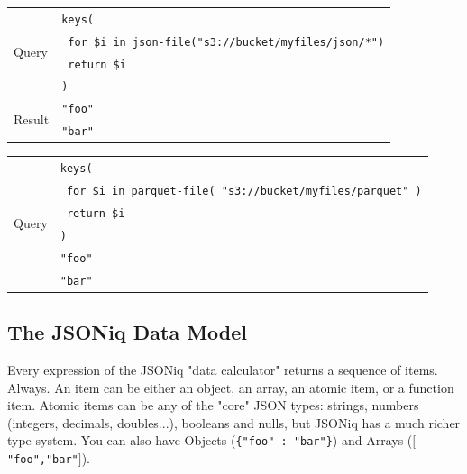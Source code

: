 \noindent
\begin{minipage}{0.66\textwidth}
\begin{center}
    \begin{tabular}{|l|l|}
        \hline
        \multirow{4}{*}{Query} & \texttt{keys(} \\
            & \texttt{  for \$i in json-file("s3://bucket/myfiles/json/*")} \\
            & \texttt{  return \$i} \\
            & \texttt{)} \\ \hline
        \multirow{2}{*}{Result} & \texttt{"foo"} \\
            & \texttt{"bar"} \\ \hline
    \end{tabular}
\end{center}
\end{minipage}

\vspace{1\baselineskip}

\noindent
\begin{minipage}{0.72\textwidth}
\begin{center}
    \begin{tabular}{|l|l|}
        \hline
        \multirow{6}{*}{Query} & \texttt{keys(} \\
            & \texttt{  for \$i in parquet-file( "s3://bucket/myfiles/parquet" )} \\
            & \texttt{  return \$i} \\
            & \texttt{)} \\ \hline
        \multirow{2}{*}{Result} & \texttt{"foo"} \\
            & \texttt{"bar"} \\ \hline
    \end{tabular}
\end{center}
\end{minipage}


\subsection{The JSONiq Data Model}

Every expression of the JSONiq "data calculator" returns a sequence of items. Always. An item can be either an object, an array, an atomic item, or a function item.
Atomic items can be any of the "core" JSON types: strings, numbers (integers, decimals, doubles...), booleans and nulls, but JSONiq has a much richer type system. You can also have Objects (\texttt{\{"foo" : "bar"\}}) and Arrays (\texttt{$[$"foo","bar"$]$}).

